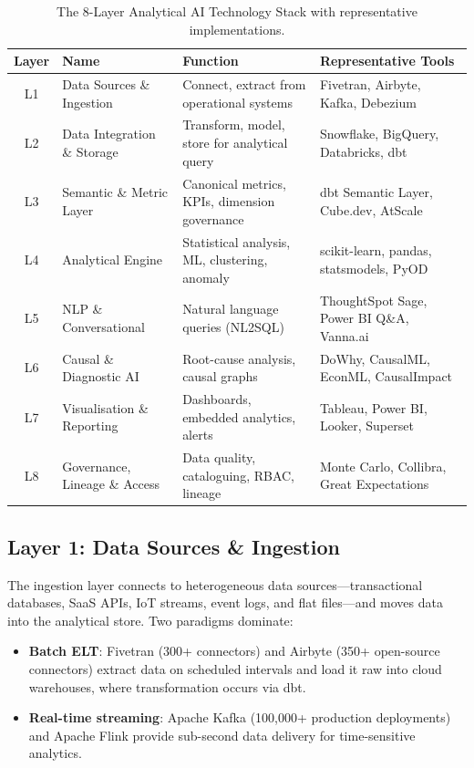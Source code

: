 \documentclass[12pt, a4paper]{article}
\begin{document}
\begin{table}[ht]
\centering
\caption{The 8-Layer Analytical AI Technology Stack with representative implementations.}
\label{tab:stack}
\begin{tabular}{c >{\raggedright\arraybackslash}p{3.5cm} >{\raggedright\arraybackslash}p{4.8cm} >{\raggedright\arraybackslash}p{4.3cm}}
\toprule
\textbf{Layer} & \textbf{Name} & \textbf{Function} & \textbf{Representative Tools} \\
\midrule
L1 & Data Sources \& Ingestion     & Connect, extract from operational systems   & Fivetran, Airbyte, Kafka, Debezium \\
L2 & Data Integration \& Storage   & Transform, model, store for analytical query & Snowflake, BigQuery, Databricks, dbt \\
L3 & Semantic \& Metric Layer      & Canonical metrics, KPIs, dimension governance & dbt Semantic Layer, Cube.dev, AtScale \\
L4 & Analytical Engine             & Statistical analysis, ML, clustering, anomaly & scikit-learn, pandas, statsmodels, PyOD \\
L5 & NLP \& Conversational         & Natural language queries (NL2SQL)            & ThoughtSpot Sage, Power BI Q\&A, Vanna.ai \\
L6 & Causal \& Diagnostic AI       & Root-cause analysis, causal graphs            & DoWhy, CausalML, EconML, CausalImpact \\
L7 & Visualisation \& Reporting    & Dashboards, embedded analytics, alerts        & Tableau, Power BI, Looker, Superset \\
L8 & Governance, Lineage \& Access & Data quality, cataloguing, RBAC, lineage      & Monte Carlo, Collibra, Great Expectations \\
\bottomrule
\end{tabular}
\end{table}

\subsection{Layer 1: Data Sources \& Ingestion}
The ingestion layer connects to heterogeneous data sources---transactional databases, SaaS APIs, IoT streams, event logs, and flat files---and moves data into the analytical store. Two paradigms dominate:

\begin{itemize}
    \item \textbf{Batch ELT}: Fivetran (300+ connectors) and Airbyte (350+ open-source connectors) extract data on scheduled intervals and load it raw into cloud warehouses, where transformation occurs via dbt.
    \item \textbf{Real-time streaming}: Apache Kafka (100,000+ production deployments) and Apache Flink provide sub-second data delivery for time-sensitive analytics.
\end{itemize}
\end{document}
